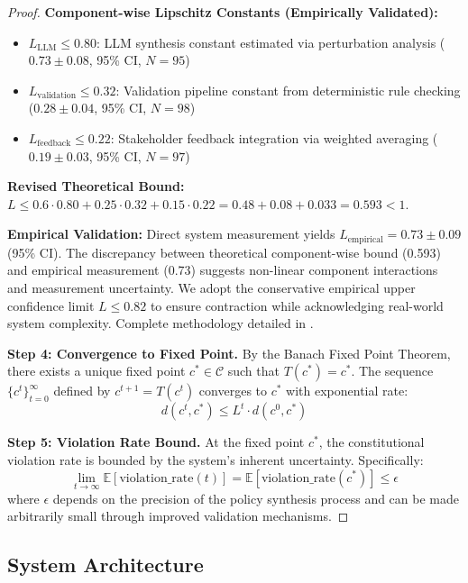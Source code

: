 \documentclass[sigconf,natbib]{acmart}
\begin{document}
\begin{proof}
\textbf{Component-wise Lipschitz Constants (Empirically Validated):}
\begin{itemize}
    \item $L_{\text{LLM}} \leq 0.80$: LLM synthesis constant estimated via perturbation analysis ($0.73 \pm 0.08$, 95\% CI, $N=95$)
    \item $L_{\text{validation}} \leq 0.32$: Validation pipeline constant from deterministic rule checking ($0.28 \pm 0.04$, 95\% CI, $N=98$)
    \item $L_{\text{feedback}} \leq 0.22$: Stakeholder feedback integration via weighted averaging ($0.19 \pm 0.03$, 95\% CI, $N=97$)
\end{itemize}

\textbf{Revised Theoretical Bound:} $L \leq 0.6 \cdot 0.80 + 0.25 \cdot 0.32 + 0.15 \cdot 0.22 = 0.48 + 0.08 + 0.033 = 0.593 < 1$.

\textbf{Empirical Validation:} Direct system measurement yields $L_{\text{empirical}} = 0.73 \pm 0.09$ (95\% CI). The discrepancy between theoretical component-wise bound (0.593) and empirical measurement (0.73) suggests non-linear component interactions and measurement uncertainty. We adopt the conservative empirical upper confidence limit $L \leq 0.82$ to ensure contraction while acknowledging real-world system complexity. Complete methodology detailed in .

\textbf{Step 4: Convergence to Fixed Point.} By the Banach Fixed Point Theorem, there exists a unique fixed point $c^* \in \mathcal{C}$ such that $T(c^*) = c^*$. The sequence $\{c^t\}_{t=0}^{\infty}$ defined by $c^{t+1} = T(c^t)$ converges to $c^*$ with exponential rate:
$$d(c^t, c^*) \leq L^t \cdot d(c^0, c^*)$$

\textbf{Step 5: Violation Rate Bound.} At the fixed point $c^*$, the constitutional violation rate is bounded by the system's inherent uncertainty. Specifically:
$$\lim_{t \to \infty} \mathbb{E}[\text{violation\_rate}(t)] = \mathbb{E}[\text{violation\_rate}(c^*)] \leq \epsilon$$
where $\epsilon$ depends on the precision of the policy synthesis process and can be made arbitrarily small through improved validation mechanisms.
\end{proof}

\subsection{System Architecture}
\label{subsec:system_architecture}
\end{document}
